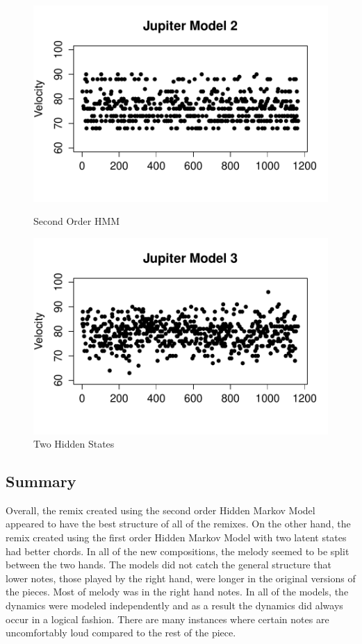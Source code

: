 \documentclass{article} %
\begin{document}
\begin{figure}[ht]
  \begin{minipage}[b]{0.5\linewidth}
    \centering
    \includegraphics[scale = 0.45]{JupiterModel2Velocity.pdf} 
    \caption{Second Order HMM} 
    \vspace{4ex}
  \end{minipage}%
  \begin{minipage}[b]{0.5\linewidth}
    \centering
    \includegraphics[scale = 0.45]{JupiterModel3Velocity.pdf} 
    \caption{Two Hidden States} 
    \vspace{4ex}
  \end{minipage} 
\end{figure}

\subsection{Summary}
Overall, the remix created using the second order Hidden Markov Model appeared to have the best structure of all of the remixes. On the other hand, the remix created using the first order Hidden Markov Model with two latent states had better chords. In all of the new compositions, the melody seemed to be split between the two hands. The models did not catch the general structure that lower notes, those played by the right hand, were longer in the original versions of the pieces. Most of melody was in the right hand notes. In all of the models, the dynamics were modeled independently and as a result the dynamics did always occur in a logical fashion. There are many instances where certain notes are uncomfortably loud compared to the rest of the piece. 
\end{document}
